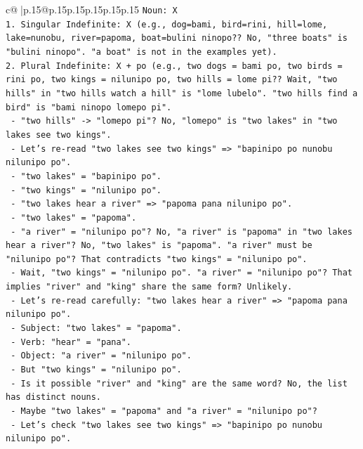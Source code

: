 \documentclass{article}
\begin{document}
{\begin{supertabular}{c@{$\;$}|p{.15\linewidth}@{}p{.15\linewidth}p{.15\linewidth}p{.15\linewidth}p{.15\linewidth}p{.15\linewidth}}
{{{\texttt{Noun: X} \\
\texttt{1. Singular Indefinite: X (e.g., dog=bami, bird=rini, hill=lome, lake=nunobu, river=papoma, boat=bulini ninopo?? No, "three boats" is "bulini ninopo". "a boat" is not in the examples yet).} \\
\texttt{2. Plural Indefinite: X + po (e.g., two dogs = bami po, two birds = rini po, two kings = nilunipo po, two hills = lome pi?? Wait, "two hills" in "two hills watch a hill" is "lome lubelo". "two hills find a bird" is "bami ninopo lomepo pi".} \\
\texttt{   {-} "two hills" {-}> "lomepo pi"? No, "lomepo" is "two lakes" in "two lakes see two kings".} \\
\texttt{   {-} Let's re{-}read "two lakes see two kings" => "bapinipo po nunobu nilunipo po".} \\
\texttt{     {-} "two lakes" = "bapinipo po".} \\
\texttt{     {-} "two kings" = "nilunipo po".} \\
\texttt{   {-} "two lakes hear a river" => "papoma pana nilunipo po".} \\
\texttt{     {-} "two lakes" = "papoma".} \\
\texttt{     {-} "a river" = "nilunipo po"? No, "a river" is "papoma" in "two lakes hear a river"? No, "two lakes" is "papoma". "a river" must be "nilunipo po"? That contradicts "two kings" = "nilunipo po".} \\
\texttt{     {-} Wait, "two kings" = "nilunipo po". "a river" = "nilunipo po"? That implies "river" and "king" share the same form? Unlikely.} \\
\texttt{     {-} Let's re{-}read carefully: "two lakes hear a river" => "papoma pana nilunipo po".} \\
\texttt{       {-} Subject: "two lakes" = "papoma".} \\
\texttt{       {-} Verb: "hear" = "pana".} \\
\texttt{       {-} Object: "a river" = "nilunipo po".} \\
\texttt{     {-} But "two kings" = "nilunipo po".} \\
\texttt{     {-} Is it possible "river" and "king" are the same word? No, the list has distinct nouns.} \\
\texttt{     {-} Maybe "two lakes" = "papoma" and "a river" = "nilunipo po"?} \\
\texttt{     {-} Let's check "two lakes see two kings" => "bapinipo po nunobu nilunipo po".} \\
}}}
\end{supertabular}}
\end{document}
